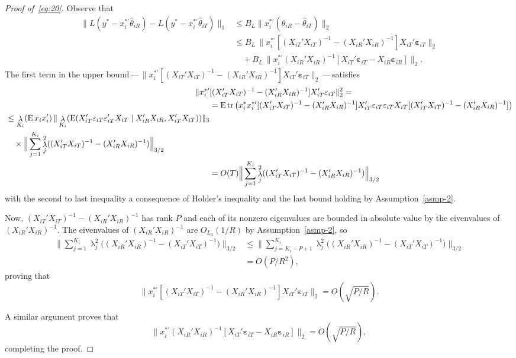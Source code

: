 \documentclass[11pt]{article}
\newcommand{\e}{\varepsilon}
\newcommand{\eb}{\mathbf{\e}}
\DeclareMathOperator{\eigen}{\lambda}
\begin{document}
\begin{proof}[Proof of~\eqref{eq:20}]
Observe that
\begin{align*}
  \|L(y^{*} -  x_i^{*\prime} \hat{\theta}_{iR}) -
  L(y^{*} - x_i^{*\prime} \hat{\theta}_{iT}) \|_1
  &\leq B_{L} \| x_i^{*\prime} (\hat{\theta}_{iR} - \hat{\theta}_{iT}) \|_2 \\
  &\leq B_{L} \, \| x_i^{*\prime} [(X_{iT}'X_{iT})^{-1} -
  (X_{iR}'X_{iR})^{-1}] X_{iT}' \eb_{iT} \|_2 \\
  &\quad+ B_L \, \| x_i^{*\prime}
  (X_{iR}'X_{iR})^{-1}[X_{iT}'\eb_{iT} - X_{iR}
  \eb_{iR} ] \|_2 .
\end{align*}
The first term in the upper bound\,---\,$\| x_i^{*\prime}
[(X_{iT}'X_{iT})^{-1} - (X_{iR}'X_{iR})^{-1}] X_{iT}' \eb_{iT} \|_2$\,---\,satisfies
\begin{align*}
  \| x_i^{*\prime} &[(X_{iT}'X_{iT})^{-1} -
  (X_{iR}'X_{iR})^{-1}] X_{iT}' \eb_{iT} \|_2^2 =\\
  &= \E \tr\big( x_i^* x_i^{*\prime}
   [(X_{iT}'X_{iT})^{-1} - (X_{iR}'X_{iR})^{-1}] X_{iT}'\eb_{iT} \eb_{iT}X_{iT}
   [(X_{iT}'X_{iT})^{-1} - (X_{iR}'X_{iR})^{-1}] \big) \\ \label{eq:8}
  \begin{split}&\leq
    \eigen_{K_i}(\E x_i x_i')
    \, \| \eigen_{K_i}(\E(X_{iT}' \eb_{iT} \eb_{iT}' X_{iT} \mid
    X_{iR}'X_{iR}, X_{iT}'X_{iT})) \|_3 \\
    & \quad \times \Big\|\sum_{j=1}^{K_i}
    \eigen_j^2((X_{iT}'X_{iT})^{-1} - (X_{iR}'X_{iR})^{-1}) \Big\|_{3/2}
  \end{split} \\
  &= O(T) \Big\|\sum_{j=1}^{K_i}
    \eigen_j^2((X_{iT}'X_{iT})^{-1} - (X_{iR}'X_{iR})^{-1}) \Big\|_{3/2}
\end{align*}
with the second to last inequality a consequence of Holder's
inequality and the last bound holding by Assumption~\ref{asmp-2}.

Now, $(X_{iT}'X_{iT})^{-1} - (X_{iR}'X_{iR})^{-1}$ has rank $P$ and
each of its nonzero eigenvalues are bounded in absolute value by the
eivenvalues of $(X_{iR}'X_{iR})^{-1}$. The eivenvalues of
$(X_{iR}'X_{iR})^{-1}$ are $O_{L_3}(1/R)$ by Assumption~\ref{asmp-2}, so
\begin{align*}
  \Big\|\sum_{j=1}^{K_i}
  \eigen_j^2\big((X_{iR}'X_{iR})^{-1} - (X_{iT}'X_{iT})^{-1}\big)\Big\|_{3/2}
  &\leq \Big\|\sum_{j=K_i - P+1}^{K_i}
  \eigen_j^2\big((X_{iR}'X_{iR})^{-1} - (X_{iT}'X_{iT})^{-1}\big) \Big\|_{3/2} \\
  &= O(P/R^2),
\end{align*}
proving that
\begin{equation*}
  \| x_i^{*\prime} [(X_{iT}'X_{iT})^{-1} -
  (X_{iR}'X_{iR})^{-1}] X_{iT}' \eb_{iT} \|_2 = O(\sqrt{P/R}).
\end{equation*}

A similar argument proves that
\begin{equation*}
  \big\| x_i^{*\prime} (X_{iR}'X_{iR})^{-1}
  [X_{iT}'\eb_{iT} - X_{iR} \eb_{iR} ] \big\|_2 =  O(\sqrt{P/R}),
\end{equation*}
completing the proof.
\end{proof}
\end{document}
